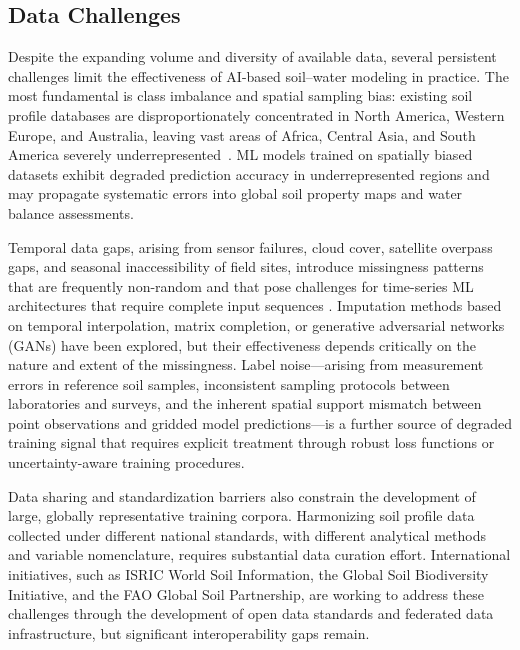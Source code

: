 \documentclass[land,review,accept,pdftex,oneauthor]{Definitions/mdpi}
\begin{document}
\subsection{Data Challenges}

Despite the expanding volume and diversity of available data, several persistent challenges limit the effectiveness of AI-based soil--water modeling in practice. The most fundamental is class imbalance and spatial sampling bias: existing soil profile databases are disproportionately concentrated in North America, Western Europe, and Australia, leaving vast areas of Africa, Central Asia, and South America severely underrepresented~\citep{Hengl2017}. ML models trained on spatially biased datasets exhibit degraded prediction accuracy in underrepresented regions and may propagate systematic errors into global soil property maps and water balance assessments.

Temporal data gaps, arising from sensor failures, cloud cover, satellite overpass gaps, and seasonal inaccessibility of field sites, introduce missingness patterns that are frequently non-random and that pose challenges for time-series ML architectures that require complete input sequences \citep{gruber2020}. Imputation methods based on temporal interpolation, matrix completion, or generative adversarial networks (GANs) have been explored, but their effectiveness depends critically on the nature and extent of the missingness. Label noise---arising from measurement errors in reference soil samples, inconsistent sampling protocols between laboratories and surveys, and the inherent spatial support mismatch between point observations and gridded model predictions---is a further source of degraded training signal that requires explicit treatment through robust loss functions or uncertainty-aware training procedures.

Data sharing and standardization barriers also constrain the development of large, globally representative training corpora. Harmonizing soil profile data collected under different national standards, with different analytical methods and variable nomenclature, requires substantial data curation effort. International initiatives, such as ISRIC World Soil Information, the Global Soil Biodiversity Initiative, and the FAO Global Soil Partnership, are working to address these challenges through the development of open data standards and federated data infrastructure, but significant interoperability gaps remain.
\end{document}
